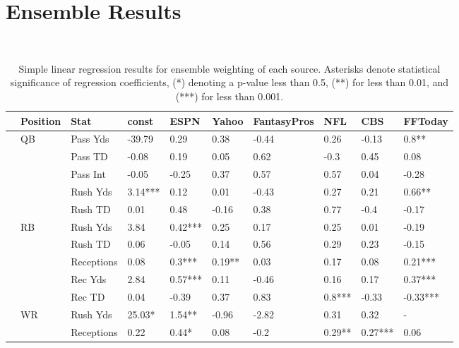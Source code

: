 \documentclass[12pt]{article}
\begin{document}
\pagebreak
\section{Ensemble Results}


﻿\begin{table}[H]
\caption{Simple linear regression results for ensemble weighting of each source. Asterisks denote statistical significance of regression coefficients, (*) denoting a p-value less than 0.5, (**) for less than 0.01, and (***) for less than 0.001.}
\centering
\begin{adjustbox}{width =\textwidth}
\begin{tabular}{llllllllll}
\toprule
{} & Position &        Stat &    const &     ESPN &    Yahoo & FantasyPros &      NFL &      CBS &   FFToday \\
\midrule
{} &       QB &    Pass Yds &   -39.79 &     0.29 &     0.38 &       -0.44 &     0.26 &    -0.13 &     0.8** \\
{} &          &     Pass TD &    -0.08 &     0.19 &     0.05 &        0.62 &     -0.3 &     0.45 &      0.08 \\
{} &          &    Pass Int &    -0.05 &    -0.25 &     0.37 &        0.57 &     0.57 &     0.04 &     -0.28 \\
{} &          &    Rush Yds &  3.14*** &     0.12 &     0.01 &       -0.43 &     0.27 &     0.21 &    0.66** \\
{} &          &     Rush TD &     0.01 &     0.48 &    -0.16 &        0.38 &     0.77 &     -0.4 &     -0.17 \\
{} &       RB &    Rush Yds &     3.84 &  0.42*** &     0.25 &        0.17 &     0.25 &     0.01 &     -0.19 \\
{} &          &     Rush TD &     0.06 &    -0.05 &     0.14 &        0.56 &     0.29 &     0.23 &     -0.15 \\
{} &          &  Receptions &     0.08 &   0.3*** &   0.19** &        0.03 &     0.17 &     0.08 &   0.21*** \\
{} &          &     Rec Yds &     2.84 &  0.57*** &     0.11 &       -0.46 &     0.16 &     0.17 &   0.37*** \\
{} &          &      Rec TD &     0.04 &    -0.39 &     0.37 &        0.83 &   0.8*** &    -0.33 &  -0.33*** \\
{} &       WR &    Rush Yds &   25.03* &   1.54** &    -0.96 &       -2.82 &     0.31 &     0.32 &         - \\
{} &          &  Receptions &     0.22 &    0.44* &     0.08 &        -0.2 &   0.29** &  0.27*** &      0.06 \\

\end{tabular}
\end{adjustbox}
\end{table}
\end{document}
